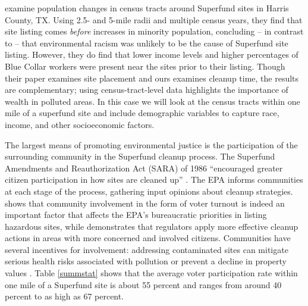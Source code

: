 \documentclass[12pt]{article}
\begin{document}

\textcite{Aydin2006} examine population changes in census tracts around Superfund sites in Harris County, TX. Using 2.5- and 5-mile radii and multiple census years, they find that site listing comes {\it before} increases in minority population, concluding -- in contrast to \textcite{burda2014environmental} -- that environmental racism was unlikely to be the cause of Superfund site listing. However, they do find that lower income levels and higher percentages of Blue Collar workers were present near the sites prior to their listing. Though their paper examines site placement and ours examines cleanup time, the results are complementary; using census-tract-level data highlights the importance of wealth in polluted areas. In this case we will look at the census tracts within one mile of a superfund site and include demographic variables to capture race, income, and other socioeconomic factors.

The largest means of promoting environmental justice is the participation of the surrounding community in the Superfund cleanup process. The Superfund Amendments and Reauthorization Act (SARA) of 1986 ``encouraged greater citizen participation in how sites are cleaned up'' \parencite{OLEM}. The EPA informs communities at each stage of the process,  gathering input opinions about cleanup strategies. \textcite{Sigman2001} shows that community involvement in the form of voter turnout is indeed an important factor that affects the EPA's bureaucratic priorities in listing hazardous sites, while \textcite{Viscusi1999} demonstrates that regulators apply more effective cleanup actions in areas with more concerned and involved citizens. Communities have several incentives for involvement: addressing contaminated sites can mitigate serious health risks associated with pollution or prevent a decline in property values \parencite{kohlhase1991impact}. Table \ref{summstat} shows that the average voter participation rate within one mile of a Superfund site is about 55 percent and ranges from around 40 percent to as high as 67 percent.
\end{document}
